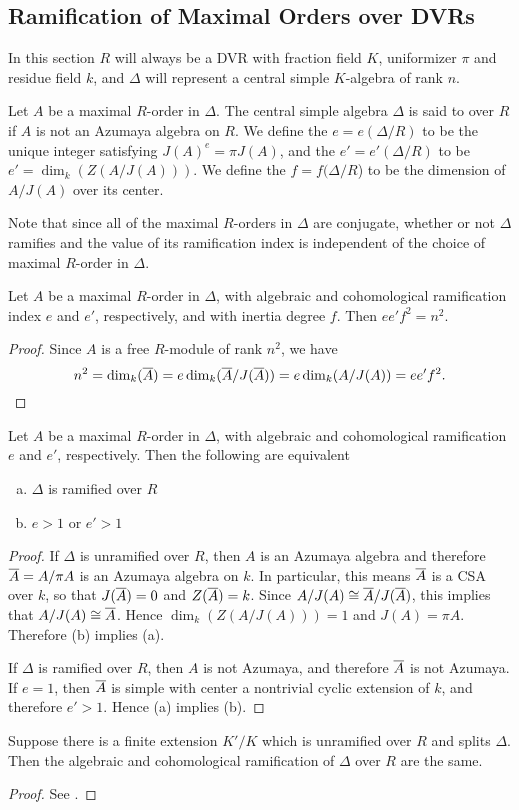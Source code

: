\subsection{Ramification of Maximal Orders over DVRs}
In this section $R$ will always be a DVR with fraction field $K$, uniformizer $\pi$ and residue field $k$, and $\Delta$ will represent a central simple $K$-algebra of rank $n$.
\begin{defn}
Let $A$ be a maximal $R$-order in $\Delta$.  The central simple algebra $\Delta$ is said to  over $R$ if $A$ is not an Azumaya algebra on $R$.  We define the  $e = e(\Delta/R)$ to be the unique integer satisfying $J(A)^e = \pi J(A)$, and the  $e' = e'(\Delta/R)$ to be $e' = \dim_k(Z(A/J(A)))$.  We define the  $f = f(\Delta/R$) to be the dimension of $A/J(A)$ over its center.
\end{defn}

Note that since all of the maximal $R$-orders in $\Delta$ are conjugate, whether or not $\Delta$ ramifies and the value of its ramification index is independent of the choice of maximal $R$-order in $\Delta$.
\begin{lem}
Let $A$ be a maximal $R$-order in $\Delta$, with algebraic and cohomological ramification index $e$ and $e'$, respectively, and with inertia degree $f$.  Then $ee'f^2 = n^2$.
\end{lem}
\begin{proof}
Since $A$ is a free $R$-module of rank $n^2$, we have
$$n^2 = \dim_{k}(\overline{A}) = e\dim_{k}(\overline{A}/J(\overline{A})) = e\dim_k(A/J(A)) = ee'f^2.$$
\end{proof}

\begin{prop}
Let $A$ be a maximal $R$-order in $\Delta$, with algebraic and cohomological ramification $e$ and $e'$, respectively.  Then the following are equivalent
\begin{enumerate}[(a)]
\item  $\Delta$ is ramified over $R$
\item  $e>1$ or $e'>1$
\end{enumerate}
\end{prop}
\begin{proof}
If $\Delta$ is unramified over $R$, then $A$ is an Azumaya algebra and therefore $\overline{A} = A/\pi A$ is an Azumaya algebra on $k$.  In particular, this means $\overline{A}$ is a CSA over $k$, so that $J(\overline{A}) = 0$ and $Z(\overline{A}) = k$.  Since $A/J(A)\cong \overline{A}/J(\overline{A})$, this implies that $A/J(A)\cong \overline{A}$.  Hence $\dim_k(Z(A/J(A))) = 1$ and $J(A) = \pi A$.  Therefore (b) implies (a).

If $\Delta$ is ramified over $R$, then $A$ is not Azumaya, and therefore $\overline{A}$ is not Azumaya.  If $e = 1$, then $\overline{A}$ is simple with center a nontrivial cyclic extension of $k$, and therefore $e'>1$.  Hence (a) implies (b).
\end{proof}

\begin{thm}
Suppose there is a finite extension $K'/K$ which is unramified over $R$ and splits $\Delta$.  Then the algebraic and cohomological ramification of $\Delta$ over $R$ are the same.
\end{thm}
\begin{proof}
See \cite{Artin&deJong}.
\end{proof}




